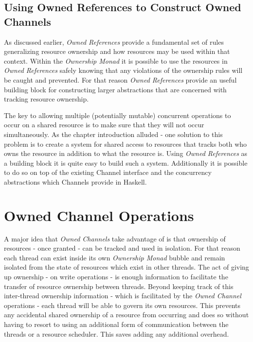 \documentclass[onehalf,11pt]{beavtex}
\begin{document}
\subsection{Using Owned References to Construct Owned Channels}

As discussed earlier, \textit{Owned References} provide a fundamental set of
rules generalizing resource ownership and how resources may be used within that
context.  Within the \textit{Ownership Monad} it is possible to use the
resources in \textit{Owned References} safely knowing that any violations of
the ownership rules will be caught and prevented.  For that reason
\textit{Owned References}  provide an useful building block for constructing
larger abstractions that are concerned with tracking resource ownership.

The key to allowing multiple (potentially mutable) concurrent operations to occur
on a shared resource is to make sure that they will not occur simultaneously.
As the chapter introduction alluded - one solution to this problem is to
create a system for shared access to resources that tracks both who owns the
resource in addition to what the resource is.
Using \textit{Owned References} as a building block it is quite easy to build
such a system. Additionally it is possible to do so on top of the existing
Channel interface and the concurrency abstractions which Channels provide in
Haskell.


\section{Owned Channel Operations}

A major idea that \textit{Owned Channels} take advantage of is that ownership
of resources - once granted - can be tracked and used in isolation. For that reason
each thread can exist inside its own \textit{Ownership Monad} bubble and
remain isolated from the state of resources which exist in other threads.
The act of giving up ownership - on write operations - is enough information to
facilitate the transfer of resource ownership between threads.
Beyond keeping track of this inter-thread ownership information - which is
facilitated by the \textit{Owned Channel} operations - each thread will be able
to govern its own resources.  This prevents any accidental shared ownership of
a resource from occurring and does so without having to resort to using an
additional form of communication between the threads or a resource scheduler.
This saves adding any additional overhead.
\end{document}
